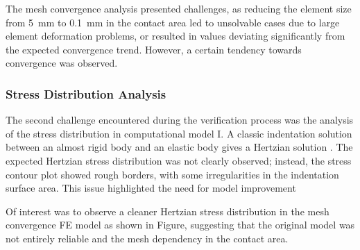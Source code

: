 The mesh convergence analysis presented challenges, as reducing the element size from \SI{5}{\milli\meter} to 
\SI{0.1}{\milli\meter} in the contact area led to unsolvable cases due to large element deformation problems, 
or resulted in values deviating significantly from the expected convergence trend. However, a certain tendency 
towards convergence was observed.

\subsubsection*{Stress Distribution Analysis}
The second challenge encountered during the verification process was the analysis of the stress distribution in 
computational model I. A classic indentation solution between an almost rigid body and an elastic body gives a Hertzian 
solution \cite{Lin2009}. The expected Hertzian stress distribution was not clearly observed; instead, the stress 
contour plot showed rough borders, with some irregularities in the indentation surface area. This issue highlighted
the need for model improvement %

Of interest was to observe a cleaner Hertzian stress distribution in the mesh convergence FE model as shown in Figure, 
suggesting that the original model was not entirely reliable and the mesh dependency in the contact area.  

